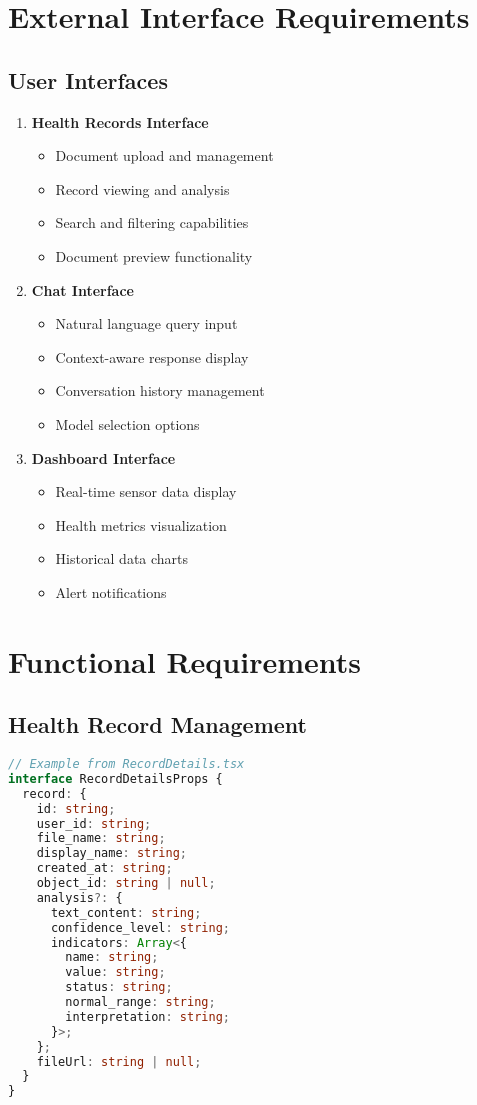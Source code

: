 \section{External Interface Requirements}
\subsection{User Interfaces}
\begin{enumerate}
    \item \textbf{Health Records Interface}
    \begin{itemize}
        \item Document upload and management
        \item Record viewing and analysis
        \item Search and filtering capabilities
        \item Document preview functionality
    \end{itemize}

    \item \textbf{Chat Interface}
    \begin{itemize}
        \item Natural language query input
        \item Context-aware response display
        \item Conversation history management
        \item Model selection options
    \end{itemize}

    \item \textbf{Dashboard Interface}
    \begin{itemize}
        \item Real-time sensor data display
        \item Health metrics visualization
        \item Historical data charts
        \item Alert notifications
    \end{itemize}
\end{enumerate}

\section{Functional Requirements}
\subsection{Health Record Management}
\begin{lstlisting}[language=typescript]
// Example from RecordDetails.tsx
interface RecordDetailsProps {
  record: {
    id: string;
    user_id: string;
    file_name: string;
    display_name: string;
    created_at: string;
    object_id: string | null;
    analysis?: {
      text_content: string;
      confidence_level: string;
      indicators: Array<{
        name: string;
        value: string;
        status: string;
        normal_range: string;
        interpretation: string;
      }>;
    };
    fileUrl: string | null;
  }
}
\end{lstlisting}

